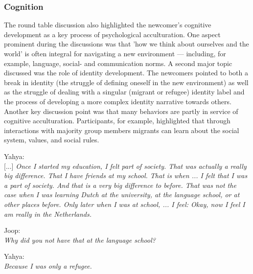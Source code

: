 \documentclass[man, 12pt, a4paper]{apa7}
\begin{document}
\subsubsection{Cognition}
The round table discussion also highlighted the newcomer’s cognitive development as a key process of psychological acculturation. One aspect prominent during the discussions was that 'how we think about ourselves and the world' is often integral for navigating a new environment --- including, for example, language, social- and communication norms. A second major topic discussed was the role of identity development. The newcomers pointed to both a break in identity (the struggle of defining oneself in the new environment) as well as the struggle of dealing with a singular (migrant or refugee) identity label and the process of developing a more complex identity narrative towards others. Another key discussion point was that many behaviors are partly in service of cognitive acculturation. Participants, for example, highlighted that through interactions with majority group members migrants can learn about the social system, values, and social rules.
\begin{displayquote}
    Yahya:\\
    {[...]} \textit{Once I started my education, I felt part of society. That was actually a really big difference. That I have friends at my school. That is when ... I felt that I was a part of society. And that is a very big difference to before. That was not the case when I was learning Dutch at the university, at the language school, or at other places before. Only later when I was at school, ... I feel: Okay, now I feel I am really in the Netherlands.}
    
    Joop:\\
    \textit{Why did you not have that at the language school?}
    
    Yahya:\\
    \textit{Because I was only a refugee.}
\end{displayquote}
\end{document}

